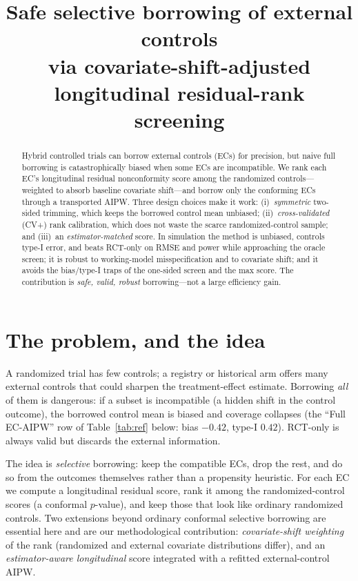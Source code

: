 \documentclass[11pt]{article}
\title{\vspace{-2em}Safe selective borrowing of external controls\\ via covariate-shift-adjusted longitudinal residual-rank screening}
\author{}
\date{}
\begin{document}
\maketitle
\vspace{-3em}

\begin{abstract}
\noindent Hybrid controlled trials can borrow external controls (ECs) for precision, but naive full borrowing is catastrophically biased when some ECs are incompatible. We rank each EC's longitudinal residual nonconformity score among the randomized controls---weighted to absorb baseline covariate shift---and borrow only the conforming ECs through a transported AIPW. Three design choices make it work: (i)~\emph{symmetric} two-sided trimming, which keeps the borrowed control mean unbiased; (ii)~\emph{cross-validated} (CV+) rank calibration, which does not waste the scarce randomized-control sample; and (iii)~an \emph{estimator-matched} score. In simulation the method is unbiased, controls type-I error, and beats RCT-only on RMSE and power while approaching the oracle screen; it is robust to working-model misspecification and to covariate shift; and it avoids the bias/type-I traps of the one-sided screen and the max score. The contribution is \emph{safe, valid, robust} borrowing---not a large efficiency gain.
\end{abstract}

\section{The problem, and the idea}
A randomized trial has few controls; a registry or historical arm offers many external controls that could sharpen the treatment-effect estimate. Borrowing \emph{all} of them is dangerous: if a subset is incompatible (a hidden shift in the control outcome), the borrowed control mean is biased and coverage collapses (the ``Full EC-AIPW'' row of Table~\ref{tab:ref} below: bias $-0.42$, type-I $0.42$). RCT-only is always valid but discards the external information.

The idea is \emph{selective} borrowing: keep the compatible ECs, drop the rest, and do so from the outcomes themselves rather than a propensity heuristic. For each EC we compute a longitudinal residual score, rank it among the randomized-control scores (a conformal $p$-value), and keep those that look like ordinary randomized controls. Two extensions beyond ordinary conformal selective borrowing are essential here and are our methodological contribution: \emph{covariate-shift weighting} of the rank (randomized and external covariate distributions differ), and an \emph{estimator-aware longitudinal} score integrated with a refitted external-control AIPW.
\end{document}
